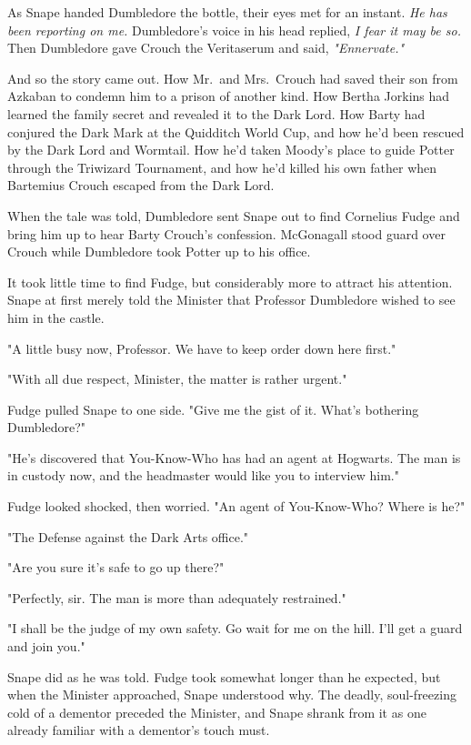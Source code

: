 As Snape handed Dumbledore the bottle, their eyes met for an instant. \emph{He has been reporting on me.} Dumbledore's voice in his head replied, \emph{I fear it may be so.} Then Dumbledore gave Crouch the Veritaserum and said, \emph{"Ennervate."}

And so the story came out. How Mr.~and Mrs.~Crouch had saved their son from Azkaban to condemn him to a prison of another kind. How Bertha Jorkins had learned the family secret and revealed it to the Dark Lord. How Barty had conjured the Dark Mark at the Quidditch World Cup, and how he'd been rescued by the Dark Lord and Wormtail. How he'd taken Moody's place to guide Potter through the Triwizard Tournament, and how he'd killed his own father when Bartemius Crouch escaped from the Dark Lord.

When the tale was told, Dumbledore sent Snape out to find Cornelius Fudge and bring him up to hear Barty Crouch's confession. McGonagall stood guard over Crouch while Dumbledore took Potter up to his office.

It took little time to find Fudge, but considerably more to attract his attention. Snape at first merely told the Minister that Professor Dumbledore wished to see him in the castle.

"A little busy now, Professor. We have to keep order down here first."

"With all due respect, Minister, the matter is rather urgent."

Fudge pulled Snape to one side. "Give me the gist of it. What's bothering Dumbledore?"

"He's discovered that You-Know-Who has had an agent at Hogwarts. The man is in custody now, and the headmaster would like you to interview him."

Fudge looked shocked, then worried. "An agent of You-Know-Who? Where is he?"

"The Defense against the Dark Arts office."

"Are you sure it's safe to go up there?"

"Perfectly, sir. The man is more than adequately restrained."

"I shall be the judge of my own safety. Go wait for me on the hill. I'll get a guard and join you."

Snape did as he was told. Fudge took somewhat longer than he expected, but when the Minister approached, Snape understood why. The deadly, soul-freezing cold of a dementor preceded the Minister, and Snape shrank from it as one already familiar with a dementor's touch must.

